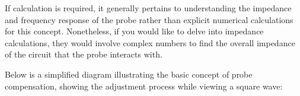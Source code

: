 If calculation is required, it generally pertains to understanding the impedance and frequency response of the probe rather than explicit numerical calculations for this concept. Nonetheless, if you would like to delve into impedance calculations, they would involve complex numbers to find the overall impedance of the circuit that the probe interacts with.

Below is a simplified diagram illustrating the basic concept of probe compensation, showing the adjustment process while viewing a square wave:

